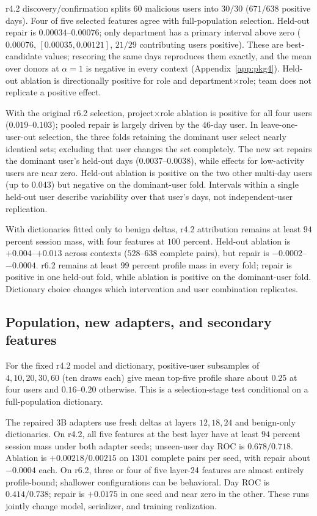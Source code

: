 r4.2 discovery/confirmation splits $60$ malicious users into $30/30$
($671/638$ positive days). Four of five selected features agree with
full-population selection. Held-out repair is $0.00034$--$0.00076$;
only department has a primary interval above zero ($0.00076$,
$[0.00035,0.00121]$, $21/29$ contributing users positive). These are
best-candidate values; rescoring the same days reproduces them exactly, and
the mean over donors at $\alpha=1$ is negative in every context
(Appendix~\ref{app:pkg4}).
Held-out ablation is directionally positive for role and
department$\times$role; team does not replicate a positive effect.

With the original r6.2 selection, project$\times$role ablation is
positive for all four users ($0.019$--$0.103$); pooled repair is largely
driven by the $46$-day user. In leave-one-user-out selection, the three folds retaining the
dominant user select nearly identical sets; excluding that user changes
the set completely. The new set repairs the dominant user's held-out
days ($0.0037$--$0.0038$), while effects for low-activity users are
near zero. Held-out ablation is positive on the two other multi-day
users (up to $0.043$) but negative on the dominant-user fold.
Intervals within a single held-out user describe variability over
that user's days, not independent-user replication.

With dictionaries fitted only to benign deltas, r4.2 attribution remains
at least $94$ percent session mass, with four features at $100$ percent.
Held-out ablation is $+0.004$--$+0.013$ across contexts
($528$--$638$ complete pairs), but repair is $-0.0002$--$-0.0004$.
r6.2 remains at least $99$ percent profile mass in every fold;
repair is positive in one held-out fold, while ablation is positive
on the dominant-user fold. Dictionary choice changes which intervention
and user combination replicates.

\subsection{Population, new adapters, and secondary features}

For the fixed r4.2 model and dictionary, positive-user subsamples of
$4,10,20,30,60$ (ten draws each) give mean top-five profile share
about $0.25$ at four users and $0.16$--$0.20$ otherwise. This is a
selection-stage test conditional on a full-population dictionary.

The repaired 3B adapters use fresh deltas at layers $12,18,24$ and
benign-only dictionaries. On r4.2, all five features at the best layer
have at least $94$ percent session mass under both adapter seeds;
unseen-user day ROC is $0.678/0.718$. Ablation is $+0.00218/0.00215$
on $1301$ complete pairs per seed, with repair about $-0.0004$ each.
On r6.2, three or four of five layer-24 features are almost entirely
profile-bound; shallower configurations can be behavioral. Day ROC is
$0.414/0.738$; repair is $+0.0175$ in one seed and near zero in the other.
These runs jointly change model, serializer, and training realization.

